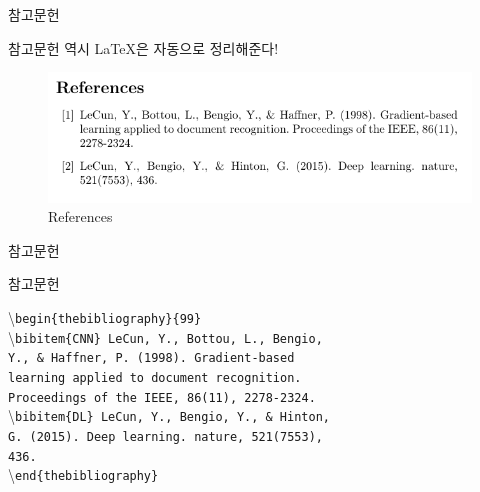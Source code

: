 \documentclass[12pt]{gshs_lecture}
\newenvironment{codeblock}[1]{
	\begin{block}{#1}
		\setstretch{1.0}
		\begin{small}
}{
		\end{small}
	\end{block}
}
\begin{document}
\begin{frame}[t]{참고문헌}
	
	참고문헌 역시 \LaTeX 은 자동으로 정리해준다!\\
	\vskip 2pc
	\begin{figure}[h]
		\centering
			\includegraphics[width=.8\textwidth]{./pictures/Ref.png}
		\caption{References}
		\label{Ref}
	\end{figure}
	
%	
	
\end{frame}

\begin{frame}[t]{참고문헌}
	\begin{codeblock}{참고문헌}
		\textbackslash \texttt{begin\{thebibliography\}\{99\}}\\
		\hspace{6mm} \textbackslash \texttt{bibitem\{CNN\} LeCun, Y., Bottou, L., Bengio, \\ \hspace{6mm} Y., \& Haffner, P. (1998). Gradient-based\\ \hspace{6mm} learning applied to document recognition.\\ \hspace{6mm} Proceedings of the IEEE, 86(11), 2278-2324.} \\
		\vskip 1pc
		\hspace{6mm} \textbackslash \texttt{bibitem\{DL\}  LeCun, Y., Bengio, Y., \& Hinton,\\ \hspace{6mm} G. (2015). Deep learning. nature, 521(7553),\\ \hspace{6mm} 436.}\\
		\textbackslash \texttt{end\{thebibliography\}}
	\end{codeblock}
	
\end{frame}
\end{document}
